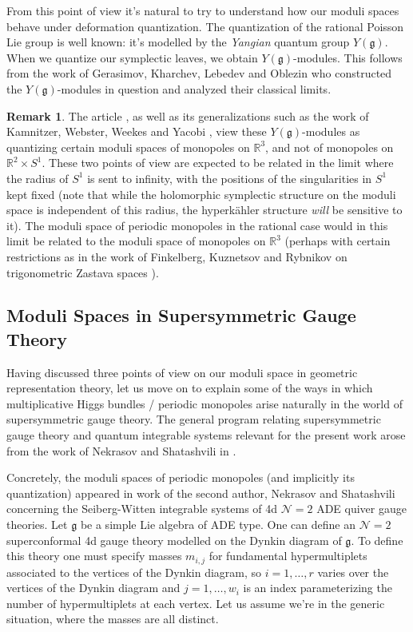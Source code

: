 \documentclass[11pt, oneside, reqno]{amsart}
\theoremstyle{definition} \newtheorem{definition}{Definition}[section]
\theoremstyle{definition} \newtheorem{remark}[definition]{Remark}
\theoremstyle{definition} \newtheorem{remarks}[definition]{Remarks}
\theoremstyle{definition} \newtheorem{question}[definition]{Question}
\theoremstyle{definition} \newtheorem*{note}{Note}
\theoremstyle{definition} \newtheorem{example}[definition]{Example}
\theoremstyle{definition} \newtheorem{examples}[definition]{Examples}
\renewcommand{\gg}{\mathfrak{g}}
\newcommand{\mc}[1]{\mathcal{#1}}
\newcommand{\RR}{\mathbb{R}}
\begin{document}
From this point of view it's natural to try to understand how our moduli spaces behave under deformation quantization.  The quantization of the rational Poisson Lie group is well known: it's modelled by the \emph{Yangian} quantum group $Y(\gg)$.  When we quantize our symplectic leaves, we obtain $Y(\gg)$-modules.  This follows from the work of Gerasimov, Kharchev, Lebedev and Oblezin \cite{GKLO} who constructed the $Y(\gg)$-modules in question and analyzed their classical limits.

\begin{remark}
The article \cite{GKLO}, as well as its generalizations such as the work of Kamnitzer, Webster, Weekes and Yacobi \cite{KWWY}, view these $Y(\gg)$-modules as quantizing certain moduli spaces of monopoles on $\RR^3$, and not of monopoles on $\RR^2 \times S^1$.  These two points of view are expected to be related in the limit where the radius of $S^1$ is sent to infinity, with the positions of the singularities in $S^1$ kept fixed (note that while the holomorphic symplectic structure on the moduli space is independent of this radius, the hyperk\"ahler structure \emph{will} be sensitive to it).  The moduli space of periodic monopoles in the rational case would in this limit be related to the moduli space of monopoles on $\RR^3$ (perhaps with certain restrictions as in the work of Finkelberg, Kuznetsov and Rybnikov on trigonometric Zastava spaces \cite{FKR}).
\end{remark}

\subsection{Moduli Spaces in Supersymmetric Gauge Theory} \label{intro_gauge_section}
Having discussed three points of view on our moduli space in geometric representation theory, let us move on to explain some of the ways in which multiplicative Higgs bundles / periodic monopoles arise naturally in the world of supersymmetric gauge theory.  The general program relating supersymmetric gauge theory and quantum integrable systems relevant for the present work arose from the work of Nekrasov and Shatashvili in \cite{Nekrasov:2009ui,Nekrasov:2009rc}.

Concretely, the moduli spaces of periodic monopoles (and implicitly its quantization) appeared in work of the second author, Nekrasov and Shatashvili \cite{NekrasovPestun, NekrasovPestunShatashvili} concerning the Seiberg-Witten integrable systems of 4d $\mc N=2$ ADE quiver gauge theories.  Let $\gg$ be a simple Lie algebra of ADE type.  One can define an $\mc N=2$ superconformal 4d gauge theory modelled on the Dynkin diagram of $\gg$.  To define this theory one must specify masses $m_{i,j}$ for fundamental hypermultiplets associated to the vertices of the Dynkin diagram, so $i = 1,\ldots,r$ varies over the vertices of the Dynkin diagram and $j=1, \ldots,w_i$ is an index parameterizing the number of hypermultiplets at each vertex.  Let us assume we're in the generic situation, where the masses are all distinct.
\end{document}
